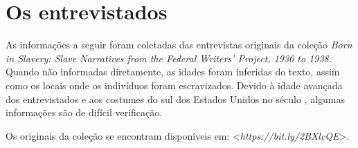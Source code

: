\chapter{Os entrevistados}

As informações a seguir foram coletadas das entrevistas originais da
coleção \emph{Born in Slavery: Slave Narratives from the Federal
Writers' Project, 1936 to 1938}. Quando não informadas diretamente, as
idades foram inferidas do texto, assim como os locais onde os indivíduos
foram escravizados. Devido à idade avançada dos entrevistados e aos
costumes do sul dos Estados Unidos no século , algumas informações
são de difícil verificação.

Os originais da coleção se encontram disponíveis em:
\textless{}\emph{https://bit.ly/2BXlcQE}\textgreater{}.

